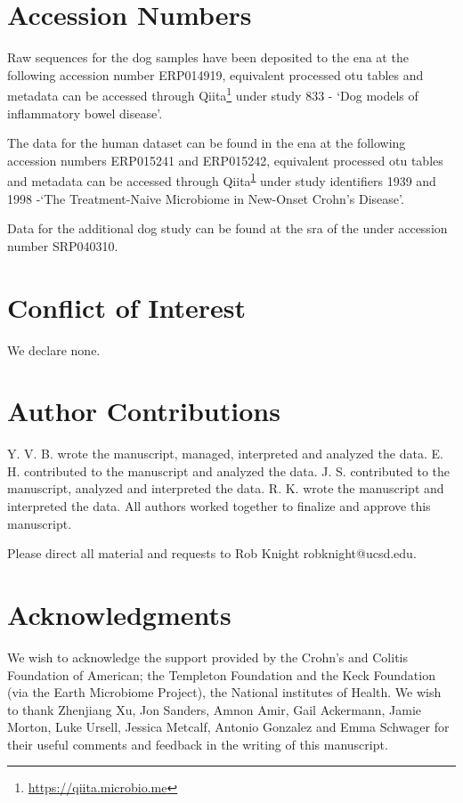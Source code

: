 \section{Accession Numbers}

Raw sequences for the dog samples have been deposited to the \gls{ena} at the following accession number ERP014919, equivalent processed \gls{otu} tables and metadata can be accessed through Qiita\footnote{\label{qiitaurl}\url{https://qiita.microbio.me}} under study 833 - `Dog models of inflammatory bowel disease'.

The data for the human dataset\cite{RN154} can be found in the \gls{ena} at the following accession numbers ERP015241 and ERP015242, equivalent processed \gls{otu} tables and metadata can be accessed through Qiita\textsuperscript{\ref{qiitaurl}} under study identifiers 1939 and 1998 -`The Treatment-Naive Microbiome in New-Onset Crohn's Disease'.

Data for the additional dog study \cite{RN153} can be found at the \gls{sra} of the under accession number SRP040310.

\section{Conflict of Interest}
We declare none.

\section{Author Contributions}
Y. V. B. wrote the manuscript, managed, interpreted and analyzed the data. E. H. contributed to the manuscript and analyzed the data. J. S. contributed to the manuscript, analyzed and interpreted the data. R. K. wrote the manuscript and interpreted the data. All authors worked together to finalize and approve this manuscript.

Please direct all material and requests to Rob Knight robknight@ucsd.edu.

\section{Acknowledgments}

We wish to acknowledge the support provided by the Crohn's and Colitis Foundation of American; the Templeton Foundation and the Keck Foundation (via the Earth Microbiome Project), the National institutes of Health. We wish to thank Zhenjiang Xu, Jon Sanders, Amnon Amir, Gail Ackermann, Jamie Morton, Luke Ursell, Jessica Metcalf, Antonio Gonzalez and Emma Schwager for their useful comments and feedback in the writing of this manuscript. 
